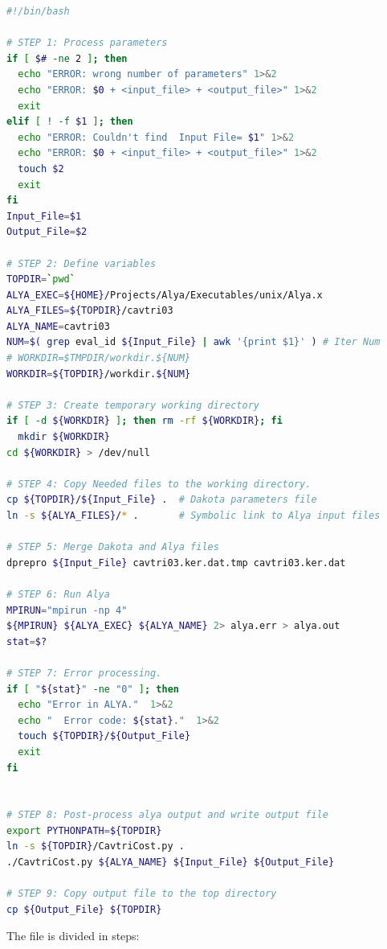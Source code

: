 \documentclass[12pt,a4paper,article]{memoir}
\begin{document}
\begin{lstlisting}[style=MyCodeStyle,language=bash]
#!/bin/bash

# STEP 1: Process parameters
if [ $# -ne 2 ]; then
  echo "ERROR: wrong number of parameters" 1>&2
  echo "ERROR: $0 + <input_file> + <output_file>" 1>&2
  exit
elif [ ! -f $1 ]; then
  echo "ERROR: Couldn't find  Input File= $1" 1>&2
  echo "ERROR: $0 + <input_file> + <output_file>" 1>&2
  touch $2
  exit 
fi
Input_File=$1
Output_File=$2

# STEP 2: Define variables
TOPDIR=`pwd`
ALYA_EXEC=${HOME}/Projects/Alya/Executables/unix/Alya.x
ALYA_FILES=${TOPDIR}/cavtri03
ALYA_NAME=cavtri03
NUM=$( grep eval_id ${Input_File} | awk '{print $1}' ) # Iter Num
# WORKDIR=$TMPDIR/workdir.${NUM}
WORKDIR=${TOPDIR}/workdir.${NUM}

# STEP 3: Create temporary working directory
if [ -d ${WORKDIR} ]; then rm -rf ${WORKDIR}; fi
  mkdir ${WORKDIR}
cd ${WORKDIR} > /dev/null

# STEP 4: Copy Needed files to the working directory.
cp ${TOPDIR}/${Input_File} .  # Dakota parameters file
ln -s ${ALYA_FILES}/* .       # Symbolic link to Alya input files

# STEP 5: Merge Dakota and Alya files
dprepro ${Input_File} cavtri03.ker.dat.tmp cavtri03.ker.dat

# STEP 6: Run Alya
MPIRUN="mpirun -np 4"
${MPIRUN} ${ALYA_EXEC} ${ALYA_NAME} 2> alya.err > alya.out
stat=$?

# STEP 7: Error processing.
if [ "${stat}" -ne "0" ]; then
  echo "Error in ALYA."  1>&2
  echo "  Error code: ${stat}."  1>&2
  touch ${TOPDIR}/${Output_File}
  exit
fi


# STEP 8: Post-process alya output and write output file
export PYTHONPATH=${TOPDIR}
ln -s ${TOPDIR}/CavtriCost.py .
./CavtriCost.py ${ALYA_NAME} ${Input_File} ${Output_File}

# STEP 9: Copy output file to the top directory
cp ${Output_File} ${TOPDIR}
\end{lstlisting}

The file is divided in steps:
\end{document}
